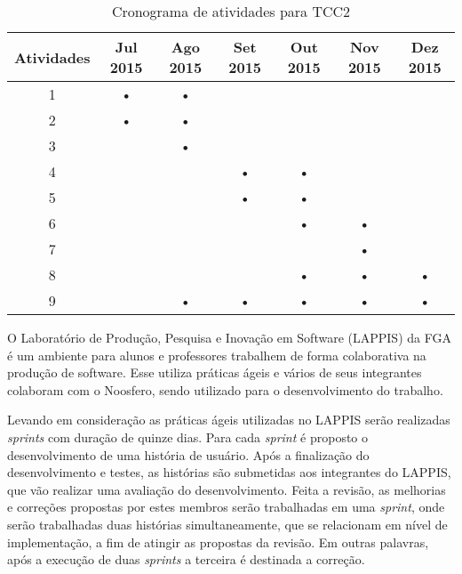 \begin{table}[h]
    \centering

    \begin{tabular}{|c|c|c|c|c|c|c|}
        \hline
        \textbf{Atividades} & \textbf{Jul 2015} & \textbf{Ago 2015} & \textbf{Set 2015}
        & \textbf{Out 2015} & \textbf{Nov 2015} & \textbf{Dez 2015} \\
        \hline\hline

        \hline
        1   & • & • &   &   &   &   \\

        \hline
        2   &  • & • &   &   &   &   \\

        \hline
        3   &   & • &   &   &   &   \\

        \hline
        4   &   &   & • & • &   &   \\

        \hline
        5   &   &   & • & • &   &   \\

        \hline
        6   &   &   &   & • & • &   \\

        \hline
        7   &   &   &   &   & • &   \\

        \hline
        8   &   &   &   & • & • & • \\

        \hline
        9   &   & •  & • & • & • & • \\

        \hline
    \end{tabular}

    \caption{Cronograma de atividades para TCC2}
    \label{cronograma}
\end{table}

O Laboratório de Produção, Pesquisa e Inovação em Software (LAPPIS) da FGA é um ambiente para  alunos e professores trabalhem de forma colaborativa na produção de software. Esse utiliza práticas ágeis e vários de seus integrantes colaboram com o Noosfero, sendo utilizado para o desenvolvimento do trabalho.

Levando em consideração as práticas ágeis utilizadas no LAPPIS serão realizadas \textit{sprints} com duração de quinze dias. Para cada \textit{sprint} é proposto o desenvolvimento de uma história de usuário. Após a finalização do desenvolvimento e testes, as histórias são submetidas aos integrantes do LAPPIS, que vão realizar uma avaliação do desenvolvimento. Feita a revisão, as melhorias e correções propostas por estes membros serão trabalhadas em uma \textit{sprint}, onde serão trabalhadas duas histórias simultaneamente, que se relacionam em nível de implementação, a fim de atingir as propostas da revisão. Em outras palavras, após a execução de duas \textit{sprints} a terceira é destinada a correção.

